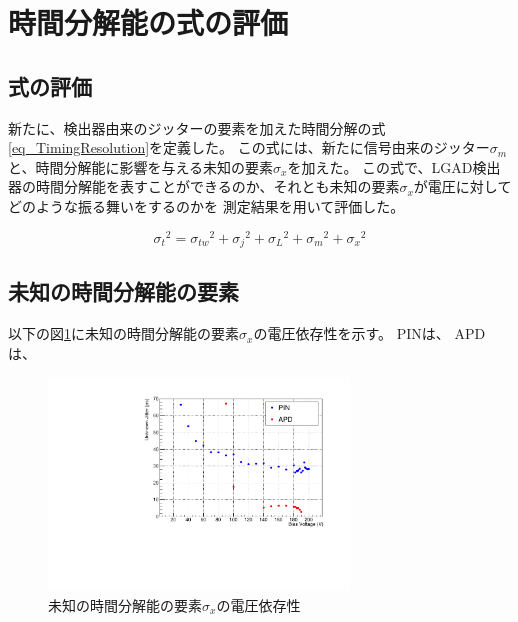 \section{時間分解能の式の評価}
\subsection{式の評価}

新たに、検出器由来のジッターの要素を加えた時間分解の式\ref{eq_TimingResolution}を定義した。
この式には、新たに信号由来のジッター$\sigma_m$と、時間分解能に影響を与える未知の要素$\sigma_x$を加えた。
この式で、LGAD検出器の時間分解能を表すことができるのか、それとも未知の要素$\sigma_x$が電圧に対してどのような振る舞いをするのかを
測定結果を用いて評価した。

\begin{equation}
    {\sigma_t}^2 = {\sigma_{tw}}^2 + {\sigma_j}^2 + {\sigma_L}^2+{\sigma_m}^2+{\sigma_x}^2
    \label{eq_TimingResolution}
\end{equation}

\subsection{未知の時間分解能の要素}
以下の図\ref{fg:unknownjittervsBias}に未知の時間分解能の要素$\sigma_x$の電圧依存性を示す。
PINは、
APDは、

\begin{figure}[h]
    \centering
    \includegraphics[width=8cm]{fig/graph/Unknownjitter_pad1ch_ver2_temp_126_20231220.pdf}
    \caption{未知の時間分解能の要素$\sigma_x$の電圧依存性}
    \label{fg:unknownjittervsBias}
\end{figure}



